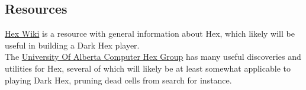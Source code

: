 \documentclass[11pt]{article}
\begin{document}
\newpage
\subsection*{Resources}

\noindent \href{https://www.hexwiki.net/index.php/Main_Page}{Hex Wiki} is a resource with general information about Hex, which likely will be useful in building a Dark Hex player.\\
\noindent The \href{http://webdocs.cs.ualberta.ca/~hayward/hex/}{University Of Alberta Computer Hex Group} has many useful discoveries and utilities for Hex, several of which will likely be at least somewhat applicable to playing Dark Hex, pruning dead cells from search for instance.
\end{document}
